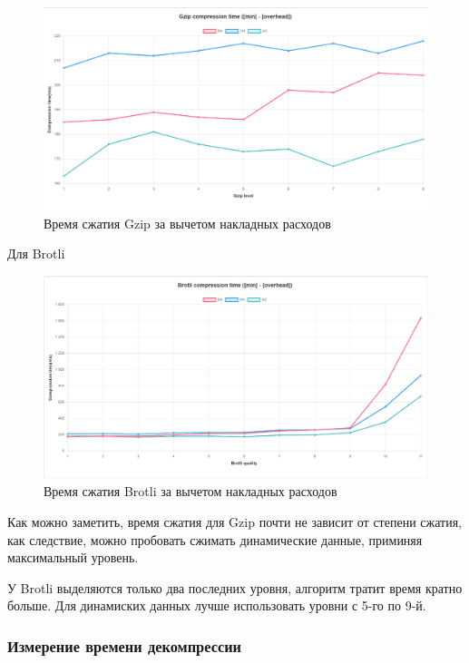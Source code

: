 \documentclass[12pt]{article}
\begin{document}
\begin{figure}[H]
    \centering
    \includegraphics[width=1\textwidth]{../images/Gzip compression time (min-overhead).png}
    \caption{Время сжатия Gzip за вычетом накладных расходов}
\end{figure}

Для Brotli
\begin{figure}[H]
    \centering
    \includegraphics[width=1\textwidth]{../images/Brotli compression time (min-overhead).png}
    \caption{Время сжатия Brotli за вычетом накладных расходов}
\end{figure}

Как можно заметить, время сжатия для Gzip почти не зависит от степени сжатия, как следствие, можно пробовать сжимать динамические данные, приминяя максимальный уровень.

У Brotli выделяются только два последних уровня, алгоритм тратит время кратно больше.
Для динамиских данных лучше использовать уровни с 5-го по 9-й.

\subsubsection{Измерение времени декомпрессии}
\end{document}
